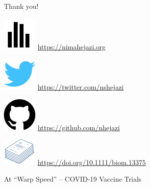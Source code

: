 \documentclass{beamer}
\begin{document}

\begin{frame}[c]{Thank you!}

\includegraphics[scale=0.14]{homepage.png} \url{https://nimahejazi.org}

\vspace{2mm}
\includegraphics[scale=0.14]{twitter-icon.png}
  \url{https://twitter.com/nshejazi}

\vspace{2mm}
\includegraphics[scale=0.11]{github-icon.png}
  \url{https://github.com/nhejazi}

\vspace{2mm}
\includegraphics[scale=0.14]{paper-icon.png}
  \url{https://doi.org/10.1111/biom.13375}

\end{frame}


\begin{frame}[standout]
  At ``Warp Speed'' -- COVID-19 Vaccine Trials
\end{frame}

\end{document}
